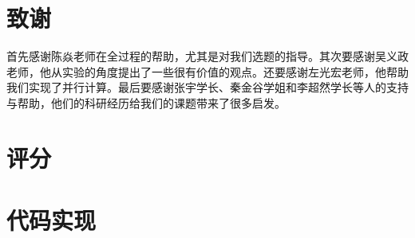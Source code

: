 \documentclass{article}
\begin{document}
	\section{致谢}
		首先感谢陈焱老师在全过程的帮助，尤其是对我们选题的指导。其次要感谢吴义政老师，他从实验的角度提出了一些很有价值的观点。还要感谢左光宏老师，他帮助我们实现了并行计算。最后要感谢张宇学长、秦金谷学姐和李超然学长等人的支持与帮助，他们的科研经历给我们的课题带来了很多启发。
		
		\nocite{LippmanLajoieMooEtAl2013}
		\flushleft \small
		
	
	\appendix
	\section{评分}
	\section{代码实现}
		\linespread{1}
%		
		
\end{document}
